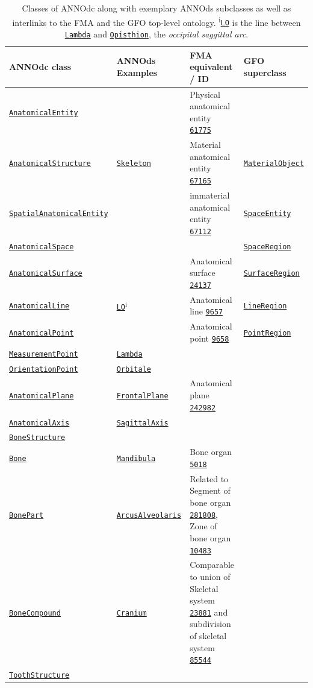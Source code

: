 \documentclass[sw]{iosart2x}
\newcommand{\anno}[1]{\href{https://annosaxfdm.de/ontology/#1}{\texttt{#1}}}
\newcommand{\gfo}[1]{\href{https://www.onto-med.de/ontologies/gfo/#1}{\texttt{#1}}}
\newcommand{\fma}[1]{\href{http://purl.org/sig/ont/fma/fma#1}{\texttt{#1}}}
\begin{document}
\begin{table}[b]
  \centering
  \caption{Classes of ANNOdc along with exemplary ANNOds subclasses as well as interlinks to the FMA and the GFO top-level ontology.
  \textsuperscript{i}\anno{LO} is the line between \anno{Lambda} and \anno{Opisthion}, the \emph{occipital saggittal arc}.}
  \label{tab:core}
  \begin{tabulary}{\textwidth}{llLl}
    \toprule
	ANNOdc class					&ANNOds Examples				&FMA equivalent / ID						&GFO superclass	\\
	\midrule
	\anno{AnatomicalEntity}			&						&Physical anatomical entity \fma{61775}\\
	\anno{AnatomicalStructure}		&\anno{Skeleton}		&Material anatomical entity	\fma{67165}		&\gfo{MaterialObject}\\							
	\anno{SpatialAnatomicalEntity}	&						&immaterial anatomical entity \fma{67112}	&\gfo{SpaceEntity}\\
	\anno{AnatomicalSpace}			&						&											&\gfo{SpaceRegion}\\
	\anno{AnatomicalSurface}		&						&Anatomical surface \fma{24137}			&\gfo{SurfaceRegion}\\
	\anno{AnatomicalLine}			&\anno{LO}\textsuperscript{i}	&Anatomical line \fma{9657}	&\gfo{LineRegion}\\
	\anno{AnatomicalPoint}			&						&Anatomical point \fma{9658}							&\gfo{PointRegion}\\
	\anno{MeasurementPoint}			&\anno{Lambda}\\%
	\anno{OrientationPoint}			&\anno{Orbitale}\\
	\anno{AnatomicalPlane}			&\anno{FrontalPlane}	&Anatomical plane \fma{242982}\\
	\anno{AnatomicalAxis}		 	&\anno{SagittalAxis}\\
	\anno{BoneStructure}\\
	\anno{Bone}						&\anno{Mandibula}				&Bone organ \fma{5018}\\
	\anno{BonePart}					&\anno{ArcusAlveolaris}	&Related to Segment of bone organ \fma{281808}, Zone of bone organ \fma{10483}\\
	\anno{BoneCompound}				&\anno{Cranium}				&Comparable to union of Skeletal system \fma{23881} and subdivision of skeletal system \fma{85544}\\
	\anno{ToothStructure}\\%

\end{tabulary}
\end{table}
\end{document}
